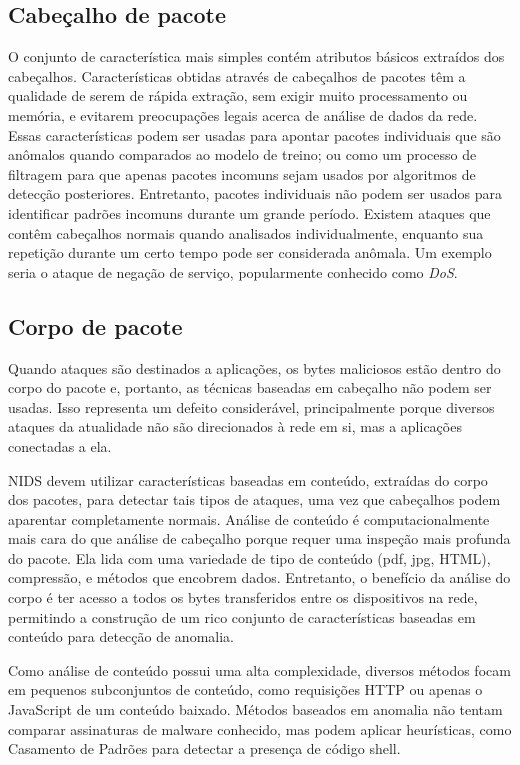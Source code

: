 \subsection{Cabeçalho de pacote}
O conjunto de característica mais simples contém atributos básicos extraídos dos cabeçalhos.
Características obtidas através de  cabeçalhos de pacotes têm a qualidade de serem de rápida extração, sem exigir muito
processamento ou memória, e evitarem preocupações legais acerca de análise de dados da rede.
Essas características podem ser usadas para apontar pacotes individuais que são anômalos quando comparados ao modelo de
treino; ou como um processo de filtragem para que apenas pacotes incomuns sejam usados por algoritmos de detecção
posteriores.
Entretanto, pacotes individuais não podem ser usados para identificar padrões incomuns durante um grande período.
Existem ataques que contêm cabeçalhos normais quando analisados individualmente, enquanto sua repetição durante
um certo tempo pode ser considerada anômala. Um exemplo seria o ataque de negação de serviço, popularmente conhecido
como \textit{DoS}.

\subsection{Corpo de pacote}
Quando ataques são destinados a aplicações, os bytes maliciosos estão dentro do corpo do
pacote e, portanto, as técnicas baseadas em cabeçalho não podem ser usadas. Isso representa um defeito considerável,
principalmente porque diversos ataques da atualidade não são direcionados à rede em si, mas a aplicações conectadas a
ela.
\par NIDS devem utilizar características baseadas em conteúdo, extraídas do corpo dos pacotes, para detectar tais tipos 
de ataques, uma vez que cabeçalhos podem aparentar completamente normais. Análise de conteúdo é computacionalmente 
mais cara do que análise de cabeçalho porque requer uma inspeção mais profunda do pacote. Ela lida com uma variedade de
tipo de conteúdo (pdf, jpg, HTML), compressão, e métodos que encobrem dados. Entretanto, o benefício da análise do
corpo é ter acesso a todos os bytes transferidos entre os dispositivos na rede, permitindo a construção de um rico
conjunto de características baseadas em conteúdo para detecção de anomalia.
\par Como análise de conteúdo possui uma alta complexidade, diversos métodos focam em pequenos subconjuntos de
conteúdo, como requisições HTTP ou apenas o JavaScript de um conteúdo baixado. Métodos baseados em anomalia não tentam
comparar assinaturas de malware conhecido, mas podem aplicar heurísticas, como Casamento de Padrões para detectar a
presença de código shell.

